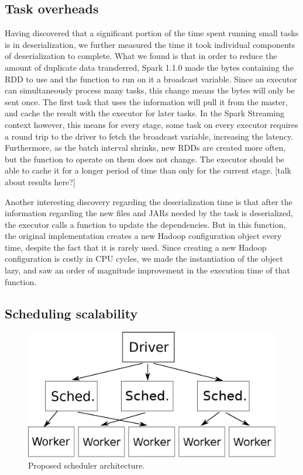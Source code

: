 \subsection{Task overheads}
Having discovered that a significant portion of the time spent running small tasks is in deserialization, we further measured the time it took individual components of deserialization to complete. What we found is that in order to reduce the amount of duplicate data transferred, Spark 1.1.0 made the bytes containing the RDD to use and the function to run on it a broadcast variable. Since an executor can simultaneously process many tasks, this change means the bytes will only be sent once. The first task that uses the information will pull it from the master, and cache the result with the executor for later tasks. In the Spark Streaming context however, this means for every stage, some task on every executor requires a round trip to the driver to fetch the broadcast variable, increasing the latency. Furthermore, as the batch interval shrinks, new RDDs are created more often, but the function to operate on them does not change. The executor should be able to cache it for a longer period of time than only for the current stage. [talk about results here?]

Another interesting discovery regarding the deserialization time is that after the information regarding the new files and JARs needed by the task is deserialized, the executor calls a function to update the dependencies. But in this function, the original implementation creates a new Hadoop configuration object every time, despite the fact that it is rarely used. Since creating a new Hadoop configuration is costly in CPU cycles, we made the instantiation of the object lazy, and saw an order of magnitude improvement in the execution time of that function.


\subsection{Scheduling scalability}

\begin{figure}[h!]
  \begin{center}
    \includegraphics[scale=0.45]{scheduler_architecture.eps}
  \end{center}
  \caption{Proposed scheduler architecture.}
  \label{fig:scheduler_architecture}
\end{figure}


